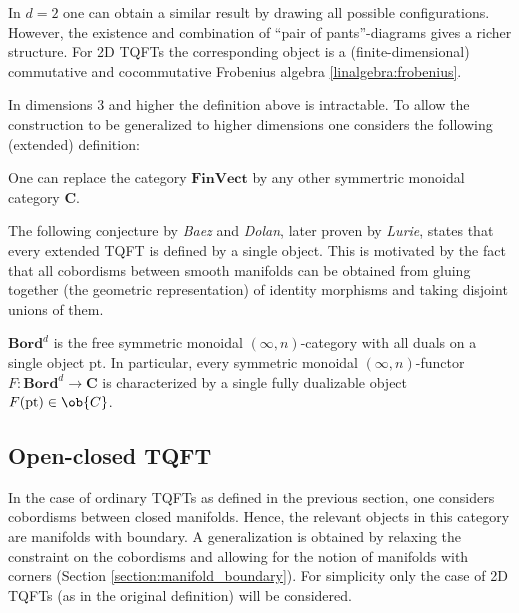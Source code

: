     \begin{example}[2D]
        In $d=2$ one can obtain a similar result by drawing all possible configurations. However, the existence and combination of ``pair of pants''-diagrams gives a richer structure. For 2D TQFTs the corresponding object is a (finite-dimensional) commutative and cocommutative Frobenius algebra \ref{linalgebra:frobenius}.
    \end{example}

    In dimensions 3 and higher the definition above is intractable. To allow the construction to be generalized to higher dimensions one considers the following (extended) definition:

    \begin{remark}
        One can replace the category $\mathbf{FinVect}$ by any other symmertric monoidal category $\mathbf{C}$.
    \end{remark}

    The following conjecture by \textit{Baez} and \textit{Dolan}, later proven by \textit{Lurie}, states that every extended TQFT is defined by a single object. This is motivated by the fact that all cobordisms between smooth manifolds can be obtained from gluing together (the geometric representation) of identity morphisms and taking disjoint unions of them.
    \begin{theorem}
        $\mathbf{Bord}^d$ is the free symmetric monoidal $(\infty,n)$-category with all duals on a single object $\mathrm{pt}$. In particular, every symmetric monoidal $(\infty,n)$-functor $F:\mathbf{Bord}^d\rightarrow\mathbf{C}$ is characterized by a single fully dualizable object $F(\mathrm{pt})\in\ob{C}$.
    \end{theorem}

\subsection{Open-closed TQFT}

    In the case of ordinary TQFTs as defined in the previous section, one considers cobordisms between closed manifolds. Hence, the relevant objects in this category are manifolds with boundary. A generalization is obtained by relaxing the constraint on the cobordisms and allowing for the notion of manifolds with corners (Section \ref{section:manifold_boundary}). For simplicity only the case of 2D TQFTs (as in the original definition) will be considered.

